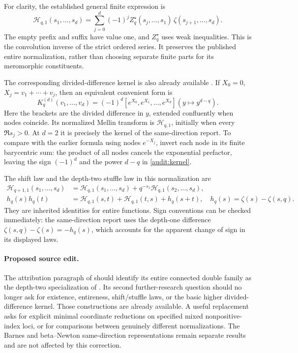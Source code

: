For clarity, the established general finite expression is
\begin{equation}\label{audit:star}
 \mathcal H_{q,1}(s_1,\ldots,s_d)=
  \sum_{j=0}^d(-1)^j
   Z_q^\star(s_j,\ldots,s_1)\,
                         \zeta(s_{j+1},\ldots,s_d).
\end{equation}
The empty prefix and suffix have value one, and $Z_q^\star$ uses weak
inequalities.  This is the convolution inverse of the strict ordered
series.  It preserves the published entire normalization, rather than
choosing separate finite parts for its meromorphic constituents.

The corresponding divided-difference kernel is also already available
\cite{INY,HarmonicGaps}.  If $X_0=0$, $X_j=v_1+\cdots+v_j$, then an
equivalent convenient form is
\begin{equation}\label{audit:kernel}
 K_q^{(d)}(v_1,\ldots,v_d)
   =(-1)^d[e^{X_0},e^{X_1},\ldots,e^{X_d}]
                         (y\mapsto y^{d-q}).
\end{equation}
Here the brackets are the divided difference in $y$, extended
confluently when nodes coincide.  Its normalized Mellin transform is
$\mathcal H_{q,1}$, initially when every $\Re s_j>0$.
At $d=2$ it is precisely the kernel of the same-direction report.
To compare with the earlier formula using nodes $e^{-X_j}$, invert
each node in its finite barycentric sum: the product of all nodes
cancels the exponential prefactor, leaving the sign $(-1)^d$ and
the power $d-q$ in \eqref{audit:kernel}.

The shift law and the depth-two stuffle law in this normalization are
\begin{align}
 \mathcal H_{q+1,1}(s_1,\ldots,s_d)
 &=\mathcal H_{q,1}(s_1,\ldots,s_d)
                   +q^{-s_1}\mathcal H_{q,1}(s_2,\ldots,s_d),
                   \label{audit:shift}\\
 h_q(s)h_q(t)
 &=\mathcal H_{q,1}(s,t)+\mathcal H_{q,1}(t,s)+h_q(s+t),
 \quad h_q(s)=\zeta(s)-\zeta(s,q).
 \label{audit:stuffle}
\end{align}
They are inherited identities for entire functions.  Sign conventions
can be checked immediately: the same-direction report uses the
depth-one difference $\zeta(s,q)-\zeta(s)=-h_q(s)$, which accounts
for the apparent change of sign in its displayed laws.

\paragraph{Proposed source edit.}
The attribution paragraph of \cite{SameDirection} should identify its
entire connected double family as the depth-two specialization of
\cite{INY,IndependentOrders}.  Its second further-research question
should no longer ask for existence, entireness, shift/stuffle laws, or
the basic higher divided-difference kernel.  Those constructions are
already available.  A useful replacement asks for explicit minimal
coordinate reductions on specified mixed nonpositive-index loci,
or for comparisons between genuinely different normalizations.
The Barnes and beta--Newton same-direction representations remain
separate results and are not affected by this correction.

